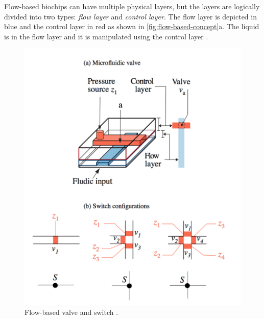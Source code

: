 Flow-based biochips can have multiple physical layers, but the layers are logically divided into two types: \emph{flow layer} and \emph{control layer}. The flow layer is depicted in blue and the control layer in red as shown in \autoref{fig:flow-based-concept}a. The liquid is in the flow layer and it is manipulated using the control layer \cite{integration-microfluidics}.

\begin{figure}[H]
\centering
\includegraphics[scale=0.425]{figures/flow-based-concept.png}
\caption[Flow-based valve and switch]{Flow-based valve and switch \cite{wajid}.}
\label{fig:flow-based-concept}
\end{figure}

